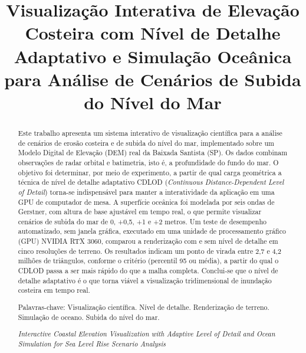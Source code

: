 \documentclass[conference]{IEEEtran}
\begin{document}
\title{Visualização Interativa de Elevação Costeira com Nível de Detalhe
Adaptativo e Simulação Oceânica para Análise de Cenários de Subida do
Nível do Mar}

\author{
}

\maketitle

\begin{abstract}
Este trabalho apresenta um sistema interativo de visualização científica
para a análise de cenários de erosão costeira e de subida do nível do mar,
implementado sobre um Modelo Digital de Elevação (DEM) real da Baixada
Santista (SP). Os dados combinam observações de radar orbital e batimetria,
isto é, a profundidade do fundo do mar. O objetivo foi determinar, por meio
de experimento, a partir de qual carga geométrica a técnica de nível de
detalhe adaptativo CDLOD (\emph{Continuous Distance-Dependent Level of
Detail}) torna-se indispensável para manter a interatividade da aplicação em uma GPU de computador de mesa. A superfície oceânica
foi modelada por seis ondas de Gerstner, com altura de base ajustável em
tempo real, o que permite visualizar cenários de subida do mar de 0, +0,5,
+1 e +2 metros. Um teste de desempenho automatizado, sem janela gráfica,
executado em uma unidade de processamento gráfico (GPU) NVIDIA RTX 3060,
comparou a renderização com e sem nível de detalhe em cinco resoluções de
terreno. Os resultados indicam um ponto de virada entre 2,7 e 4,2 milhões de
triângulos, conforme o critério (percentil 95 ou média), a partir do qual
o CDLOD passa a ser mais rápido do que a malha completa. Conclui-se que o nível de detalhe adaptativo é o que
torna viável a visualização tridimensional de inundação costeira em tempo
real.

Palavras-chave: Visualização científica. Nível de detalhe. Renderização de
terreno. Simulação de oceano. Subida do nível do mar.

\textit{Interactive Coastal Elevation Visualization with Adaptive Level of
Detail and Ocean Simulation for Sea Level Rise Scenario Analysis}


\end{abstract}
\end{document}
